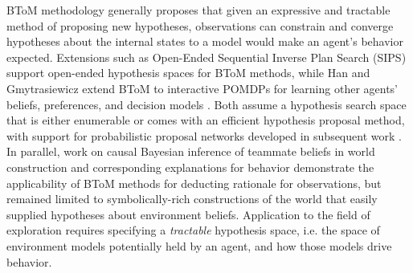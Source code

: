 \documentclass[letterpaper,10pt,conference]{ieeeconf}
\begin{document}
BToM methodology generally proposes that given an expressive and tractable method of proposing new hypotheses, observations can constrain and converge hypotheses about the internal states to a model would make an agent's behavior expected. Extensions such as Open-Ended Sequential Inverse Plan Search (SIPS) \cite{zhixuan2020sips} support open-ended hypothesis spaces for BToM methods, while Han and Gmytrasiewicz extend BToM to interactive POMDPs for learning other agents' beliefs, preferences, and decision models \cite{han2018intentional}. Both assume a hypothesis search space that is either enumerable or comes with an efficient hypothesis proposal method, with support for probabilistic proposal networks developed in subsequent work \cite{lew2023smcp3}. In parallel, work on causal Bayesian inference of teammate beliefs in world construction and corresponding explanations for behavior \cite{ying2023inferring, ying2025belief} demonstrate the applicability of BToM methods for deducting rationale for observations, but remained limited to symbolically-rich constructions of the world that easily supplied hypotheses about environment beliefs. Application to the field of exploration requires specifying a \textit{tractable} hypothesis space, i.e. the space of environment models potentially held by an agent, and how those models drive behavior.


\end{document}
